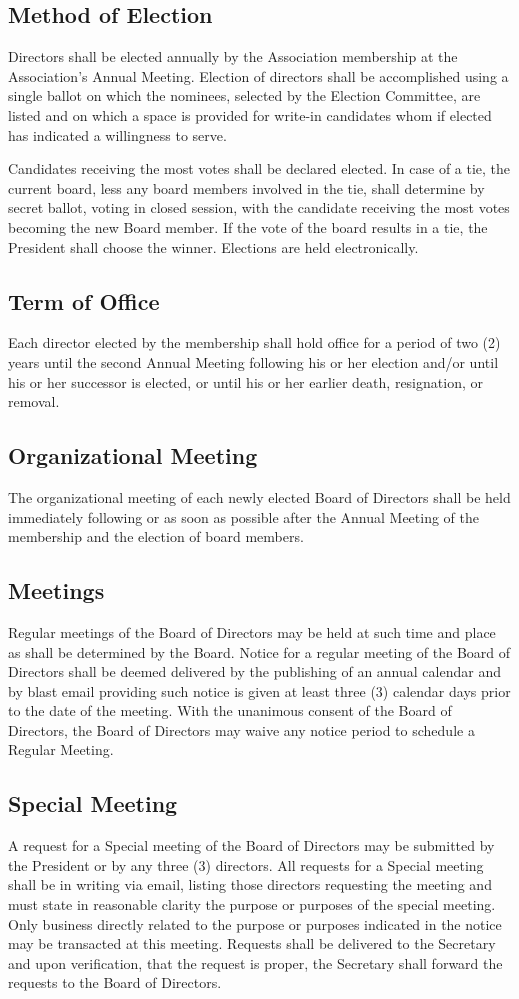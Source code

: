 \documentclass[letterpaper,11pt]{article}
\begin{document}
\subsection{Method of Election}
Directors shall be elected annually by the Association membership at the Association's Annual Meeting. Election of directors shall be accomplished using a single ballot on which the nominees, selected by the Election Committee, are listed and on which a space is provided for write-in candidates whom if elected has indicated a willingness to serve.

Candidates receiving the most votes shall be declared elected. In case of a tie, the current board, less any board members involved in the tie, shall determine by secret ballot, voting in closed session, with the candidate receiving the most votes becoming the new Board member. If the vote of the board results in a tie, the President shall choose the winner.
Elections are held electronically.
\subsection{Term of Office}
Each director elected by the membership shall hold office for a period of two (2) years until the second Annual Meeting following his or her election and/or until his or her successor is elected, or until his or her earlier death, resignation, or removal.
\subsection{Organizational Meeting}
The organizational meeting of each newly elected Board of Directors shall be held immediately following or as soon as possible after the Annual Meeting of the membership and the election of board members.
\subsection{Meetings}
Regular meetings of the Board of Directors may be held at such time and place as shall be determined by the Board. Notice for a regular meeting of the Board of Directors shall be deemed delivered by the publishing of an annual calendar and by blast email providing such notice is given at least three (3) calendar days prior to the date of the meeting. With the unanimous consent of the Board of Directors, the Board of Directors may waive any notice period to schedule a Regular Meeting.
\subsection{Special Meeting}
A request for a Special meeting of the Board of Directors may be submitted by the President or by any three (3) directors. All requests for a Special meeting shall be in writing via email, listing those directors requesting the meeting and must state in reasonable clarity the purpose or purposes of the special meeting. Only business directly related to the purpose or purposes indicated in the notice may be transacted at this meeting. Requests shall be delivered to the Secretary and upon verification, that the request is proper, the Secretary shall forward the requests to the Board of Directors.
\end{document}
